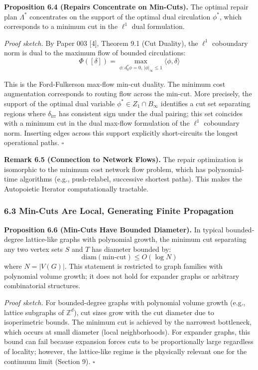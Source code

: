 \documentclass[
]{article}
\begin{document}
\textbf{Proposition 6.4 (Repairs Concentrate on Min-Cuts).} The optimal
repair plan \(\Lambda^*\) concentrates on the support of the optimal
dual circulation \(\phi^*\), which corresponds to a minimum cut in the
\(\ell^1\) dual formulation.

\emph{Proof sketch.} By Paper 003 {[}4{]}, Theorem 9.1 (Cut Duality),
the \(\ell^1\) coboundary norm is dual to the maximum flow of bounded
circulations:
\[\Phi([\delta]) = \max_{\phi: d_0^*\phi = 0,\, |\phi|_\infty \leq 1} \langle \phi, \delta \rangle\]

This is the Ford-Fulkerson max-flow min-cut duality. The minimum cost
augmentation corresponds to routing flow across the min-cut. More
precisely, the support of the optimal dual variable
\(\phi^* \in Z_1 \cap B_\infty\) identifies a cut set separating regions
where \(\delta_{\text{irr}}\) has consistent sign under the dual
pairing; this set coincides with a minimum cut in the dual max-flow
formulation of the \(\ell^1\) coboundary norm. Inserting edges across
this support explicitly short-circuits the longest operational paths.
\(\square\)

\textbf{Remark 6.5 (Connection to Network Flows).} The repair
optimization is isomorphic to the minimum cost network flow problem,
which has polynomial-time algorithms (e.g., push-relabel, successive
shortest paths). This makes the Autopoietic Iterator computationally
tractable.

\subsubsection{6.3 Min-Cuts Are Local, Generating Finite
Propagation}\label{min-cuts-are-local-generating-finite-propagation}

\textbf{Proposition 6.6 (Min-Cuts Have Bounded Diameter).} In typical
bounded-degree lattice-like graphs with polynomial growth, the minimum
cut separating any two vertex sets \(S\) and \(T\) has diameter bounded
by: \[\text{diam}(\text{min-cut}) \leq O(\log N)\] where \(N = |V(G)|\).
This statement is restricted to graph families with polynomial volume
growth; it does not hold for expander graphs or arbitrary combinatorial
structures.

\emph{Proof sketch.} For bounded-degree graphs with polynomial volume
growth (e.g., lattice subgraphs of \(\mathbb{Z}^d\)), cut sizes grow
with the cut diameter due to isoperimetric bounds. The minimum cut is
achieved by the narrowest bottleneck, which occurs at small diameter
(local neighborhoods). For expander graphs, this bound can fail because
expansion forces cuts to be proportionally large regardless of locality;
however, the lattice-like regime is the physically relevant one for the
continuum limit (Section 9). \(\square\)
\end{document}
